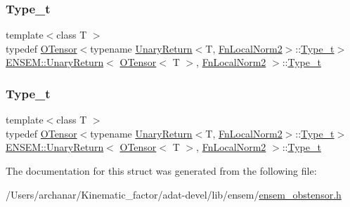 \subsubsection{\texorpdfstring{Type\_t}{Type\_t}\hspace{0.1cm}{\footnotesize\ttfamily [2/3]}}
{\footnotesize\ttfamily template$<$class T $>$ \\
typedef \mbox{\hyperlink{classENSEM_1_1OTensor}{O\+Tensor}}$<$typename \mbox{\hyperlink{structENSEM_1_1UnaryReturn}{Unary\+Return}}$<$T, \mbox{\hyperlink{structENSEM_1_1FnLocalNorm2}{Fn\+Local\+Norm2}}$>$\+::\mbox{\hyperlink{structENSEM_1_1UnaryReturn_3_01OTensor_3_01T_01_4_00_01FnLocalNorm2_01_4_a6d6f8fdbc603bf32e2db2deaca0b82fa}{Type\+\_\+t}}$>$ \mbox{\hyperlink{structENSEM_1_1UnaryReturn}{E\+N\+S\+E\+M\+::\+Unary\+Return}}$<$ \mbox{\hyperlink{classENSEM_1_1OTensor}{O\+Tensor}}$<$ T $>$, \mbox{\hyperlink{structENSEM_1_1FnLocalNorm2}{Fn\+Local\+Norm2}} $>$\+::\mbox{\hyperlink{structENSEM_1_1UnaryReturn_3_01OTensor_3_01T_01_4_00_01FnLocalNorm2_01_4_a6d6f8fdbc603bf32e2db2deaca0b82fa}{Type\+\_\+t}}}

\mbox{\label{structENSEM_1_1UnaryReturn_3_01OTensor_3_01T_01_4_00_01FnLocalNorm2_01_4_a6d6f8fdbc603bf32e2db2deaca0b82fa}} 
\subsubsection{\texorpdfstring{Type\_t}{Type\_t}\hspace{0.1cm}{\footnotesize\ttfamily [3/3]}}
{\footnotesize\ttfamily template$<$class T $>$ \\
typedef \mbox{\hyperlink{classENSEM_1_1OTensor}{O\+Tensor}}$<$typename \mbox{\hyperlink{structENSEM_1_1UnaryReturn}{Unary\+Return}}$<$T, \mbox{\hyperlink{structENSEM_1_1FnLocalNorm2}{Fn\+Local\+Norm2}}$>$\+::\mbox{\hyperlink{structENSEM_1_1UnaryReturn_3_01OTensor_3_01T_01_4_00_01FnLocalNorm2_01_4_a6d6f8fdbc603bf32e2db2deaca0b82fa}{Type\+\_\+t}}$>$ \mbox{\hyperlink{structENSEM_1_1UnaryReturn}{E\+N\+S\+E\+M\+::\+Unary\+Return}}$<$ \mbox{\hyperlink{classENSEM_1_1OTensor}{O\+Tensor}}$<$ T $>$, \mbox{\hyperlink{structENSEM_1_1FnLocalNorm2}{Fn\+Local\+Norm2}} $>$\+::\mbox{\hyperlink{structENSEM_1_1UnaryReturn_3_01OTensor_3_01T_01_4_00_01FnLocalNorm2_01_4_a6d6f8fdbc603bf32e2db2deaca0b82fa}{Type\+\_\+t}}}



The documentation for this struct was generated from the following file\+:\begin{DoxyCompactItemize}
\item 
/\+Users/archanar/\+Kinematic\+\_\+factor/adat-\/devel/lib/ensem/\mbox{\hyperlink{adat-devel_2lib_2ensem_2ensem__obstensor_8h}{ensem\+\_\+obstensor.\+h}}\end{DoxyCompactItemize}
